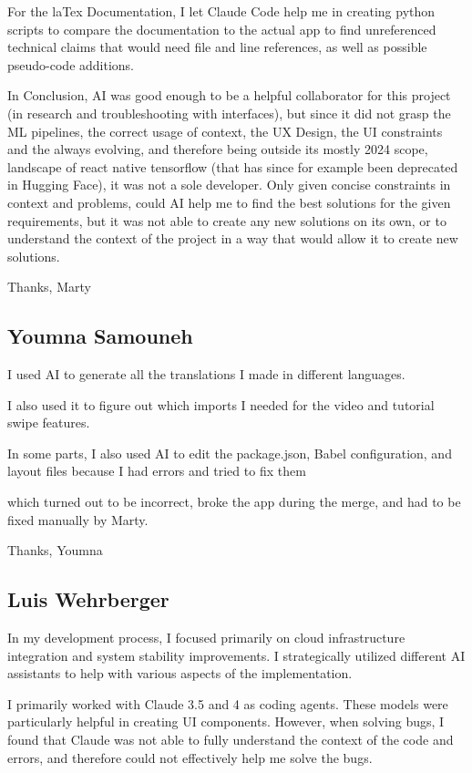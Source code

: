 For the laTex Documentation, I let Claude Code help me in creating python scripts to compare the documentation to the actual app to find unreferenced technical claims that would need file and line references, as well as possible pseudo-code additions.

In Conclusion, AI was good enough to be a helpful collaborator for this project (in research and troubleshooting with interfaces), but since it did not grasp the ML pipelines, the correct usage of context, the UX Design, the UI constraints and the always evolving, and therefore being outside its mostly 2024 scope, landscape of react native tensorflow (that has since for example been deprecated in Hugging Face), it was not a sole developer.
Only given concise constraints in context and problems, could AI help me to find the best solutions for the given requirements, but it was not able to create any new solutions on its own, or to understand the context of the project in a way that would allow it to create new solutions.

Thanks,
Marty

\subsection{Youmna Samouneh}

I used AI to generate all the translations I made in different languages.

I also used it to figure out which imports I needed for the video and tutorial swipe features.

In some parts, I also used AI to edit the package.json, Babel configuration, and layout files because I had errors and tried to fix them 

which turned out to be incorrect, broke the app during the merge, and had to be fixed manually by Marty.

Thanks,
Youmna

\subsection{Luis Wehrberger}

In my development process, I focused primarily on cloud infrastructure integration and system stability improvements. I strategically utilized different AI assistants to help with various aspects of the implementation.

I primarily worked with Claude 3.5 and 4 as coding agents. These models were particularly helpful in creating UI components. However, when solving bugs, I found that Claude was not able to fully understand the context of the code and errors, and therefore could not effectively help me solve the bugs.

